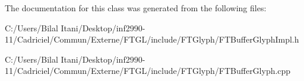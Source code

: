 The documentation for this class was generated from the following files\+:\begin{DoxyCompactItemize}
\item 
C\+:/\+Users/\+Bilal Itani/\+Desktop/inf2990-\/11/\+Cadriciel/\+Commun/\+Externe/\+F\+T\+G\+L/include/\+F\+T\+Glyph/F\+T\+Buffer\+Glyph\+Impl.\+h\item 
C\+:/\+Users/\+Bilal Itani/\+Desktop/inf2990-\/11/\+Cadriciel/\+Commun/\+Externe/\+F\+T\+G\+L/include/\+F\+T\+Glyph/F\+T\+Buffer\+Glyph.\+cpp\end{DoxyCompactItemize}
